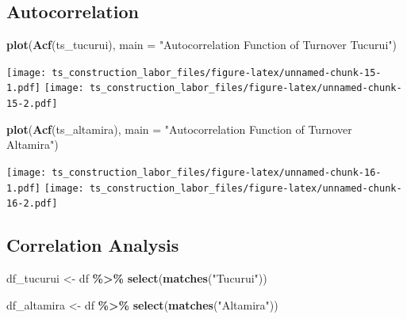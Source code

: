 \documentclass[
]{article}
\newenvironment{Shaded}{\begin{snugshade}}{\end{snugshade}}
\newcommand{\AttributeTok}[1]{\textcolor[rgb]{0.13,0.29,0.53}{#1}}
\newcommand{\FunctionTok}[1]{\textcolor[rgb]{0.13,0.29,0.53}{\textbf{#1}}}
\newcommand{\NormalTok}[1]{#1}
\newcommand{\OtherTok}[1]{\textcolor[rgb]{0.56,0.35,0.01}{#1}}
\newcommand{\SpecialCharTok}[1]{\textcolor[rgb]{0.81,0.36,0.00}{\textbf{#1}}}
\newcommand{\StringTok}[1]{\textcolor[rgb]{0.31,0.60,0.02}{#1}}
\begin{document}
\hypertarget{autocorrelation}{%
\subsection{Autocorrelation}\label{autocorrelation}}

\begin{Shaded}
\begin{Highlighting}[]
\FunctionTok{plot}\NormalTok{(}\FunctionTok{Acf}\NormalTok{(ts\_tucurui), }\AttributeTok{main =} \StringTok{"Autocorrelation Function of Turnover Tucurui"}\NormalTok{)}
\end{Highlighting}
\end{Shaded}

\texttt{[image: ts\_construction\_labor\_files/figure-latex/unnamed-chunk-15-1.pdf]}
\texttt{[image: ts\_construction\_labor\_files/figure-latex/unnamed-chunk-15-2.pdf]}

\begin{Shaded}
\begin{Highlighting}[]
\FunctionTok{plot}\NormalTok{(}\FunctionTok{Acf}\NormalTok{(ts\_altamira), }\AttributeTok{main =} \StringTok{"Autocorrelation Function of Turnover Altamira"}\NormalTok{)}
\end{Highlighting}
\end{Shaded}

\texttt{[image: ts\_construction\_labor\_files/figure-latex/unnamed-chunk-16-1.pdf]}
\texttt{[image: ts\_construction\_labor\_files/figure-latex/unnamed-chunk-16-2.pdf]}

\hypertarget{correlation-analysis}{%
\subsection{Correlation Analysis}\label{correlation-analysis}}

\begin{Shaded}
\begin{Highlighting}[]
\NormalTok{df\_tucurui }\OtherTok{\textless{}{-}}\NormalTok{ df }\SpecialCharTok{\%\textgreater{}\%}
  \FunctionTok{select}\NormalTok{(}\FunctionTok{matches}\NormalTok{(}\StringTok{"Tucurui"}\NormalTok{))}

\NormalTok{df\_altamira }\OtherTok{\textless{}{-}}\NormalTok{ df }\SpecialCharTok{\%\textgreater{}\%}
  \FunctionTok{select}\NormalTok{(}\FunctionTok{matches}\NormalTok{(}\StringTok{"Altamira"}\NormalTok{))}
\end{Highlighting}
\end{Shaded}
\end{document}
